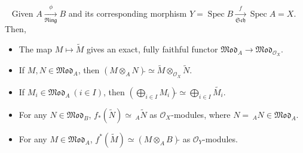 \documentclass[11pt,a4paper,footinclude=true,headinclude=true]{scrbook} %
\DeclareMathOperator{\Spec}{Spec}
\newcommand{\OO}{\mathcal{O}}
\newcommand{\Sch}{\mathfrak{Sch}}
\newcommand{\Ring}{\mathfrak{Ring}}
\newcommand{\<}{\langle}
\newcommand{\>}{\rangle}
\newcommand{\MOD}{\mathfrak{Mod}}
\newenvironment{proposition}[2][]
{\renewcommand\theinnercustomprop{#2}\innercustomprop[#1] 
\begin{mdframed}[backgroundcolor=gray!20]\ }
{\end{mdframed}\endinnercustomprop}
\begin{document}
\begin{proposition}{5.2}\newline
    Given $A\xrightarrow[\Ring]{\phi}B$ and its corresponding morphism $Y=\Spec B\xrightarrow[\Sch]{f}\Spec A=X$. Then,
    \begin{itemize}
        \item[(a)] The map $M\mapsto\widetilde{M}$ gives an exact, fully faithful functor $\MOD_{A}\to\MOD_{\OO_X}$.
        \item[(b)] If $M,N\in \MOD_A$, then $(M\otimes_AN)\widetilde{}\simeq\widetilde{M}\otimes_{\OO_X}\widetilde{N}$.
        \item[(c)] If $M_i\in \MOD_A\ (i\in I)$, then $(\bigoplus_{i\in I}M_i)\widetilde{}\simeq\bigoplus_{i\in I}\widetilde{M_i}$.
        \item[(d)] For any $N\in \MOD_B$,  $f_\ast(\widetilde{N})\simeq\,_A\widetilde{N}$ as $\OO_X$-modules, where $N=\,_AN\in \MOD_A$.
        \item[(e)] For any $M\in \MOD_A$,  $f^\ast(\widetilde{M})\simeq(M\otimes_AB)\widetilde{}$ as $\OO_Y$-modules.
    \end{itemize}
\end{proposition}
\end{document}
